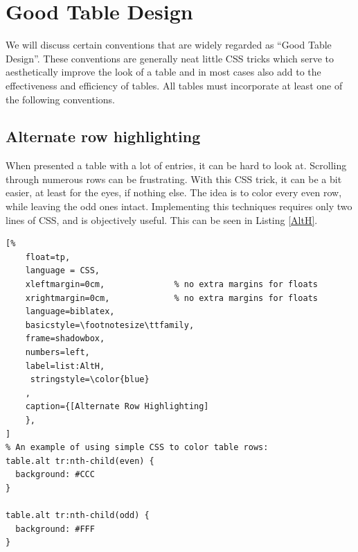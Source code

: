 %
%
%
%
%

\chapter{Good Table Design}
\label{chap:gtd}

We will discuss certain conventions that are widely regarded as ``Good
Table Design''. These conventions are generally neat little CSS tricks
which serve to aesthetically improve the look of a table and in most
cases also add to the effectiveness and efficiency of tables. All tables
must incorporate at least one of the following conventions.


\section{Alternate row highlighting}
When presented a table with a lot of entries, it can be hard to look at.
Scrolling through numerous rows can be frustrating. With this CSS trick,
it can be a bit easier, at least for the eyes, if nothing else. The idea
is to color every even row, while leaving the odd ones intact.
Implementing this techniques requires only two lines of CSS, and is
objectively useful. This can be seen in Listing \ref{AltH}.


\begin{lstlisting}[%
    float=tp,
    language = CSS,
    xleftmargin=0cm,              % no extra margins for floats
    xrightmargin=0cm,             % no extra margins for floats
    language=biblatex,
    basicstyle=\footnotesize\ttfamily,
    frame=shadowbox,
    numbers=left,
    label=list:AltH,
     stringstyle=\color{blue}
    ,
    caption={[Alternate Row Highlighting]
    },
]
% An example of using simple CSS to color table rows:
table.alt tr:nth-child(even) {
  background: #CCC
}

table.alt tr:nth-child(odd) {
  background: #FFF
}
\end{lstlisting}


